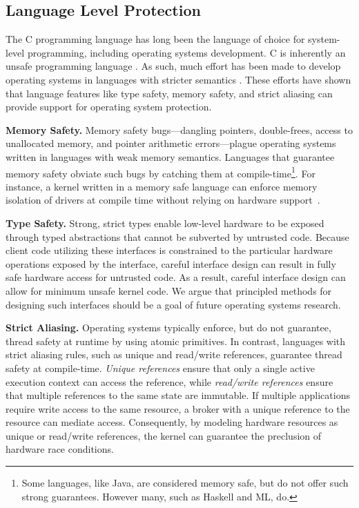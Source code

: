 \subsection{Language Level Protection}

The C programming language has long been the language of choice for system-level
programming, including operating systems development. C is inherently an unsafe
programming language \cite{kint:osdi2012, undefined:apsys2012}. As such, much
effort has been made to develop operating systems in languages with stricter
semantics \cite{singularity:sigops, house:icfp2005, unikernels:2013}. These
efforts have shown that language features like type safety, memory safety, and
strict aliasing can provide support for operating system protection.

{\bf Memory Safety.}
Memory safety bugs---dangling pointers, double-frees, access to unallocated
memory, and pointer arithmetic errors---plague operating systems written in
languages with weak memory semantics. Languages that guarantee memory safety
obviate such bugs by catching them at compile-time\footnote{Some languages, like
Java, are considered memory safe, but do not offer such strong guarantees.
However many, such as Haskell and ML, do.}. For instance, a kernel written in a
memory safe language can enforce memory isolation of drivers at compile time
without relying on hardware support~\cite{spin:sosp}.

{\bf Type Safety.}
Strong, strict types enable low-level hardware to be exposed through typed
abstractions that cannot be subverted by untrusted code. Because client code
utilizing these interfaces is constrained to the particular hardware operations
exposed by the interface, careful interface design can result in fully safe
hardware access for untrusted code. As a result, careful interface design can
allow for minimum unsafe kernel code. We argue that principled methods for
designing such interfaces should be a goal of future operating systems research.

{\bf Strict Aliasing.}
Operating systems typically enforce, but do not guarantee, thread safety at
runtime by using atomic primitives. In contrast, languages with strict aliasing
rules, such as unique and read/write references, guarantee thread safety at
compile-time. \textit{Unique references} ensure that only a single active
execution context can access the reference, while \textit{read/write references}
ensure that multiple references to the same state are immutable. If multiple
applications require write access to the same resource, a broker with a unique
reference to the resource can mediate access. Consequently, by modeling hardware
resources as unique or read/write references, the kernel can guarantee the
preclusion of hardware race conditions.

